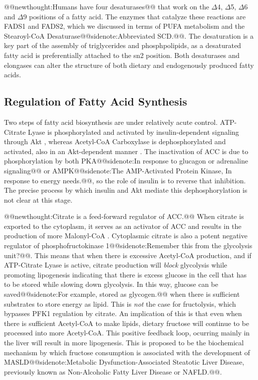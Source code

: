 \documentclass{tufte-handout}
\makeatletter
\def\newthought#1{@@newthought:#1@@}
\def\sidenote#1{@@sidenote:#1@@}
\makeatother
\begin{document}
\newthought{Humans have four desaturases} that work on the $\Delta$4, $\Delta$5, $\Delta$6 and $\Delta$9 positions of a fatty acid.  The enzymes that catalyze these reactions are FADS1 and FADS2, which we discussed in terms of PUFA metabolism and the Stearoyl-CoA Desaturase\sidenote{Abbreviated SCD\nomenclature{SCD}{Stearoyl-CoA Desaturase}.}.  The desaturation is a key part of the assembly of triglycerides and phosphpolipids, as a desaturated fatty acid is preferentially attached to the sn2 position.  Both desaturases and elongases can alter the structure of both dietary and endogenously produced fatty acids.

\subsection{Regulation of Fatty Acid Synthesis}

Two steps of fatty acid biosynthesis are under relatively acute control.  ATP-Citrate Lyase is phosphorylated and activated by insulin-dependent signaling through Akt \citep{Berwick2002}, whereas Acetyl-CoA Carboxylase is dephosphorylated and activated, also in an Akt-dependent manner \citep{Witters1992}.  The inactivation of ACC is due to phosphorylation by both PKA\sidenote{In response to glucagon or adrenaline\index{Hormones!Adrenaline} signaling} or AMPK\sidenote{The AMP-Activated Protein Kinase, In response to energy needs.}, so the role of insulin is to reverse that inhibition.  The precise process by which insulin and Akt mediate this dephosphorylation is not clear at this stage.  

\newthought{Citrate is a feed-forward regulator of ACC.}  When citrate is exported to the cytoplasm, it serves as an activator of ACC and results in the production of more Malonyl-CoA \citep{VAGELOS1963}.  Cytoplasmic citrate is also a potent negative regulator of phosphofructokinase 1\sidenote{Remember this from the glycolysis unit?}.  This means that when there is excessive Acetyl-CoA production, and if ATP-Citrate Lyase is active, citrate production will \emph{block} glycolysis while promoting lipogenesis indicating that there is excess glucose in the cell that has to be stored while slowing down glycolysis. In this way, glucose can be saved\sidenote{For example, stored as glycogen.} when there is sufficient substrates to store energy as lipid.  This is \emph{not} the case for fructolysis, which bypasses PFK1 regulation by citrate.  An implication of this is that even when there is sufficient Acetyl-CoA to make lipids, dietary fructose will continue to be processed into more Acetyl-CoA.  This positive feedback loop, ocurring mainly in the liver will result in more lipogenesis.  This is proposed to be the biochemical mechanism by which fructose consumption is associated with the development of MASLD\sidenote{Metabolic Dysfunction-Associated Steatotic Liver Disease, previously known as Non-Alcoholic Fatty Liver Disease or NAFLD.}\citep{Lim2010}.
\end{document}
